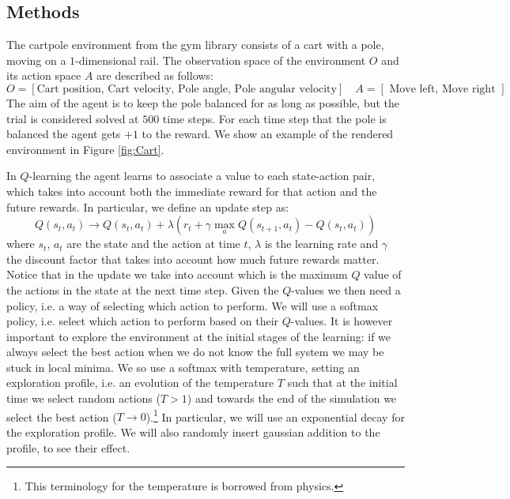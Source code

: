 \subsection{Methods}
The cartpole environment from the gym library consists of a cart with a pole, moving on a $1$-dimensional rail. The observation space of the environment $O$ 
and its action space $A$ are described as follows:
$$
O = [ \mbox{Cart position, Cart velocity, Pole angle, Pole angular velocity}] \quad A = [\mbox{ Move left, Move right }]
$$
The aim of the agent is to keep the pole balanced for as long as possible, but the trial is considered solved at $500$ time steps. For each time step 
that the pole is balanced the agent gets $+1$ to the reward.  We show an example of the rendered environment in Figure \ref{fig:Cart}.

In $Q$-learning the agent learns to associate a value to each state-action pair, which takes into account  both the immediate reward for that
action and the future rewards. In particular, we define an update step as:
\begin{equation}
    Q(s_t, a_t) \rightarrow Q(s_t, a_t)+\lambda\left( r_t +\gamma \max_{a}Q(s_{t+1}, a_t)-Q(s_t, a_t) \right)
\end{equation}
where $s_t$, $a_t$ are the state and the action at time $t$, $\lambda$ is the learning rate and $\gamma$ the discount factor that takes into account how much future 
rewards matter. Notice that in the update we take into account which is the maximum $Q$ value of the actions in the state at the next time step.
Given the $Q$-values we then need a policy, i.e. a way of selecting which action to perform. We will use a softmax policy, i.e. select which action to perform 
based on their $Q$-values. It is however important to explore the environment at the initial stages of the learning: if we always select the best action when 
we do not know the full system we may be stuck in local minima. We so use a softmax with temperature, setting an exploration profile, i.e. an evolution of the temperature $T$
such that at the initial time we select random actions ($T>1$) and towards the end of the simulation we select the best action ($T\rightarrow 0$).\footnote{This terminology
for the temperature is borrowed from physics.} In particular, we will use an exponential decay for the exploration profile. We will also randomly insert gaussian addition to 
the profile, to see their effect.

